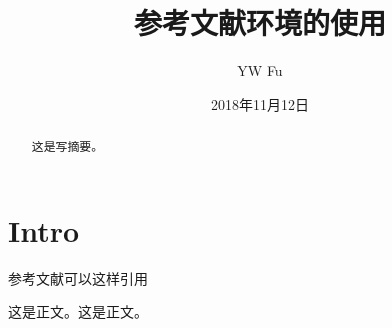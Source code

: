 \documentclass{ctexart}		%
\title{参考文献环境的使用}
\author{YW Fu}
\date{2018年11月12日}
\begin{document}
	\maketitle 
	\begin{abstract}	%
		这是写摘要。
	\end{abstract}	
	\section{Intro}
	参考文献\cite{.2018d}可以这样引用\cite{Yocom.2018,Das.2018,.2018e}	
	
	这是正文。这是正文\citep{.2018e}。
														
	\newpage %
			
\end{document}

